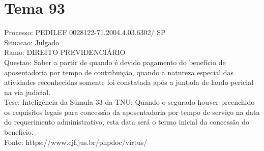 \documentclass[12pt]{article}
\begin{document}
\section*{Tema 93}
Processo: PEDILEF 0028122-71.2004.4.03.6302/ SP\\
Situacao: Julgado\\
Ramo: DIREITO PREVIDENCIÁRIO\\
Questao: Saber a partir de quando é devido pagamento do benefício de aposentadoria por tempo de contribuição, quando a natureza especial das atividades reconhecidas somente foi constatada após a juntada de laudo pericial na via judicial.\\
Tese: Inteligência da Súmula 33 da TNU: Quando o segurado houver preenchido os requisitos legais para concessão da aposentadoria por tempo de serviço na data do requerimento administrativo, esta data será o termo inicial da concessão do benefício.\\
Fonte: https://www.cjf.jus.br/phpdoc/virtus/
\end{document}
